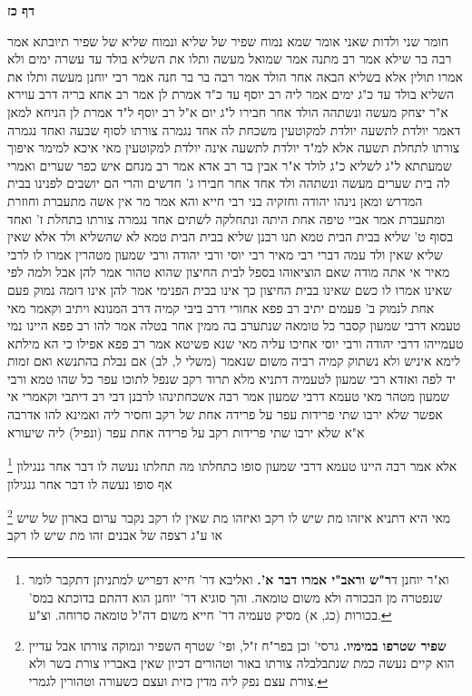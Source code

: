 \documentclass[12pt, openany]{book}
\newcommand{\sethebfont}{
\fontsize{10.5pt}{21.0pt} \selectfont
}
\newcommand{\twocol}[1]{
	{\sethebfont \begin{multicols}{2}
			#1
	\end{multicols}}	
}
\newcommand{\sectname}{}
\newcommand{\newsection}[1]{
	\addcontentsline{toc}{section}{#1}
	\renewcommand{\sectname}{#1}	
	\vspace{-\baselineskip}
	\begin{center}
		\textbf{%
\fontsize{16pt}{16pt}\selectfont
			#1}
	\end{center}
	\vspace{-\baselineskip}
	\nopagebreak
}
\newcommand{\footnotecomment}[1]{
	\renewcommand\thefootnote{}
	\footnote{#1}}
\newcommand{\commenta}[1]{\footnotecomment{#1}}
\begin{document}
\newsection{דף כז}
\twocol{חומר שני ולדות שאני אומר שמא נמוח שפיר של שליא ונמוח שליא של שפיר תיובתא 
אמר רבה בר שילא אמר רב מתנה אמר שמואל מעשה ותלו את השליא בולד עד עשרה ימים ולא אמרו תולין אלא בשליא הבאה אחר הולד 
אמר רבה בר בר חנה אמר רבי יוחנן מעשה ותלו את השליא בולד עד כ"ג ימים אמר ליה רב יוסף עד כ"ד אמרת לן 
אמר רב אחא בריה דרב עוירא א"ר יצחק מעשה ונשתהה הולד אחר חבירו ל"ג יום א"ל רב יוסף ל"ד אמרת לן 
הניחא למאן דאמר יולדת לתשעה יולדת למקוטעין משכחת לה אחד נגמרה צורתו לסוף שבעה ואחד נגמרה צורתו לתחלת תשעה אלא למ"ד יולדת לתשעה אינה יולדת למקוטעין מאי איכא למימר 
איפוך שמעתתא ל"ג לשליא כ"ג לולד 
א"ר אבין בר רב אדא אמר רב מנחם איש כפר שערים ואמרי לה בית שערים מעשה ונשתהה ולד אחד אחר חבירו ג' חדשים והרי הם יושבים לפנינו בבית המדרש ומאן נינהו יהודה וחזקיה בני רבי חייא 
והא אמר מר אין אשה מתעברת וחוזרת ומתעברת אמר אביי טיפה אחת היתה ונתחלקה לשתים אחד נגמרה צורתו בתחלת ז' ואחד בסוף ט'
שליא בבית הבית טמא תנו רבנן שליא בבית הבית טמא לא שהשליא ולד אלא שאין שליא שאין ולד עמה דברי רבי מאיר רבי יוסי ורבי יהודה ורבי שמעון מטהרין 
אמרו לו לרבי מאיר אי אתה מודה שאם הוציאוהו בספל לבית החיצון שהוא טהור אמר להן אבל ולמה לפי שאינו 
אמרו לו כשם שאינו בבית החיצון כך אינו בבית הפנימי אמר להן אינו דומה נמוק פעם אחת לנמוק ב' פעמים 
יתיב רב פפא אחורי דרב ביבי קמיה דרב המנונא ויתיב וקאמר מאי טעמא דרבי שמעון קסבר כל טומאה שנתערב בה ממין אחר בטלה 
אמר להו רב פפא היינו נמי טעמייהו דרבי יהודה ורבי יוסי אחיכו עליה מאי שנא פשיטא 
אמר רב פפא אפילו כי הא מילתא לימא איניש ולא נשתוק קמיה רביה משום שנאמר (משלי ל, לב) אם נבלת בהתנשא ואם זמות יד לפה 
ואזדא רבי שמעון לטעמיה דתניא מלא תרוד רקב שנפל לתוכו עפר כל שהו טמא ורבי שמעון מטהר 
מאי טעמא דרבי שמעון אמר רבה אשכחתינהו לרבנן דבי רב דיתבי וקאמרי אי אפשר שלא ירבו שתי פרידות עפר על פרידה אחת של רקב וחסיר ליה 
ואמינא להו אדרבה א"א שלא ירבו שתי פרידות רקב על
פרידה אחת עפר (ונפיל) ליה שיעורא 
\commenta{וא"ר יוחנן ד\textbf{ר"ש וראב"י אמרו דבר א'.} ואליבא דר' חייא דפריש למתניתן דתקבר לומר שנפטרה מן הבכורה ולא משום טומאה. והך סוגיא דר' יוחנן הוא דהתם בדוכתא במס' בכורות (כג, א) מסיק טעמיה דר' חייא משום דה"ל טומאה סרוחה. וצ"ע. }
אלא אמר רבה היינו טעמא דרבי שמעון סופו כתחלתו מה תחלתו נעשה לו דבר אחר גנגילון אף סופו נעשה לו דבר אחר גנגילון 
\commenta{\textbf{שפיר שטרפו במימיו.} גרסי' וכן בפר"ח ז"ל, ופי' שטרף השפיר ונמוקה צורתו אבל עדיין הוא קיים נעשה כמת שנתבלבלה צורתו באור וטהורים דכיון שאין באבריו צורת בשר ולא צורת עצם נפק ליה מדין כזית ועצם כשעורה וטהורין לגמרי. }
מאי היא דתניא איזהו מת שיש לו רקב ואיזהו מת שאין לו רקב נקבר ערום בארון של שיש או ע"ג רצפה של אבנים זהו מת שיש לו רקב
}
\end{document}
